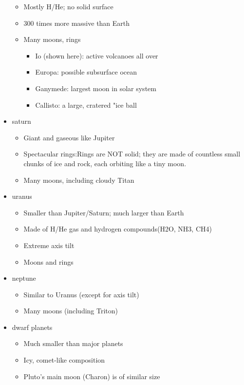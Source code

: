 \documentclass[12pt]{article}
\begin{document}
\begin{itemize}
\begin{itemize}
        \item Mostly H/He; no solid surface
        \item 300 times more massive than Earth
        \item Many moons, rings
        \begin{itemize}
            \item Io (shown here): active volcanoes all over
            \item Europa: possible subsurface ocean
            \item Ganymede: largest moon in solar system
            \item Callisto: a large, cratered "ice ball
        \end{itemize}
    \end{itemize}
    \item saturn
    \begin{itemize}
        \item Giant and gaseous like Jupiter
        \item Spectacular rings:Rings are NOT solid; they are made of countless small chunks of ice and rock, each orbiting like a tiny moon.
        \item Many moons, including cloudy Titan
    \end{itemize}
    \item uranus
    \begin{itemize}
        \item Smaller than Jupiter/Saturn; much larger than Earth
        \item Made of H/He gas and hydrogen compounds(H2O, NH3, CH4)
        \item Extreme axis tilt
        \item Moons and rings
    \end{itemize}
    \item neptune
    \begin{itemize}
        \item Similar to Uranus (except for axis tilt)
        \item Many moons (including Triton)
    \end{itemize}
    \item dwarf planets
    \begin{itemize}
        \item Much smaller than major planets
        \item Icy, comet-like composition
        \item Pluto's main moon (Charon) is of similar size
    \end{itemize}
\end{itemize}
\end{document}
